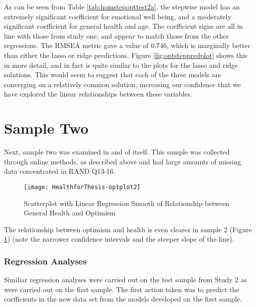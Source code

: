 \documentclass{article}
\begin{document}
As can be seen from Table \ref{tab:homstepopttest2a}, the stepwise model has an extremely significant coefficient for emotional well being, and a moderately significant coefficient for general health and age. The coefficient signs are all in line with those from study one, and appear to match those from the other regressions. The RMSEA metric gave a value of 0.746, which is marginally better than either the lasso or ridge predictions. Figure \ref{fig:optsteppredplot} shows this in more detail, and in fact is quite similar to the plots for the lasso and ridge solutions. This would seem to suggest that each of the three models are converging on a relatively common solution, increasing our confidence that we have explored the linear relationships between these variables. 


\part{Sample Two}

Next, sample two was examined in and of itself. This sample was collected through online methods, as described above and had large amounts of missing data concentrated in RAND Q13-16. 

\begin{figure}
\texttt{[image: HealthforThesis-optplot2]}
  \caption{Scatterplot with Linear Regression Smooth of Relationship between General Health and Optimism}
  \label{fig:genhealthoptplot2}
\end{figure}


The relationship between optimism and health is even clearer in sample 2 (Figure \ref{fig:genhealthoptplot2}) (note the narrower confidence intervals and the steeper slope of the line).

\section{Regression Analyses}
\label{sec:regression-analyses}

Similiar regression analyses were carried out on the test sample from Study 2 as were carried out on the first sample.  The first action taken was to predict the coefficients in the new data set from the models developed on the first sample.







\end{document}
